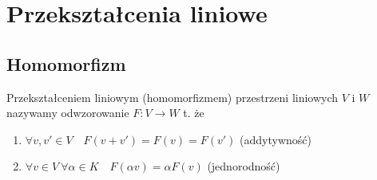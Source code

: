 \section{Przekształcenia liniowe} 
\subsection{Homomorfizm}
\begin{df}
    Przekształceniem liniowym (homomorfizmem) przestrzeni liniowych $V \text{ i } W$ nazywamy odwzorowanie $F: V \rightarrow W$ t. że
    \begin{enumerate}[{(}1{)}]
        \item $\forall v, v' \in V \quad F(v+v') = F(v) = F(v')$ (addytywność) 
        \item $\forall v \in V \ \forall \alpha \in K \quad F(\alpha v) = \alpha F(v)$ (jednorodność)
    \end{enumerate}
\end{df}

